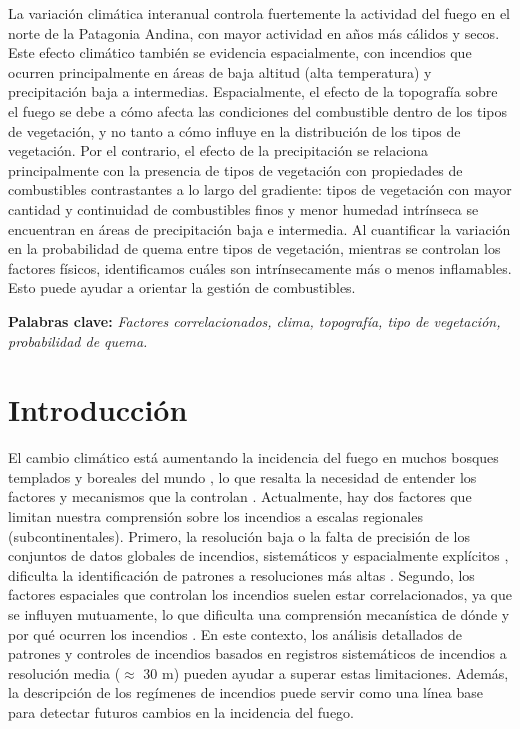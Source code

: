 La variación climática interanual controla fuertemente la actividad del fuego en el norte de la Patagonia Andina, con mayor actividad en años más cálidos y secos. Este efecto climático también se evidencia espacialmente, con incendios que ocurren principalmente en áreas de baja altitud (alta temperatura) y precipitación baja a intermedias. Espacialmente, el efecto de la topografía sobre el fuego se debe a cómo afecta las condiciones del combustible dentro de los tipos de vegetación, y no tanto a cómo influye en la distribución de los tipos de vegetación. Por el contrario, el efecto de la precipitación se relaciona principalmente con la presencia de tipos de vegetación con propiedades de combustibles contrastantes a lo largo del gradiente: tipos de vegetación con mayor cantidad y continuidad de combustibles finos y menor humedad intrínseca se encuentran en áreas de precipitación baja e intermedia. Al cuantificar la variación en la probabilidad de quema entre tipos de vegetación, mientras se controlan los factores físicos, identificamos cuáles son intrínsecamente más o menos inflamables. Esto puede ayudar a orientar la gestión de combustibles.

\noindent \textbf{Palabras clave:} \textit{Factores correlacionados, clima, topografía, tipo de vegetación, probabilidad de quema.}

\section{Introducción}

El cambio climático está aumentando la incidencia del fuego en muchos bosques templados y boreales del mundo \citep{flannigan_implications_2009,jones_global_2022,yang2023characterization,Jones2024}, lo que resalta la necesidad de entender los factores y mecanismos que la controlan \citep{bowman_vegetation_2020, shuman_reimagine_2022}. Actualmente, hay dos factores que limitan nuestra comprensión sobre los incendios a escalas regionales (subcontinentales). Primero, la resolución baja o la falta de precisión de los conjuntos de datos globales de incendios, sistemáticos y espacialmente explícitos \citep{giglio_collection_2018, long2019, lizundia-loiola_spatio-temporal_2020}, dificulta la identificación de patrones a resoluciones más altas \citep{chuvieco_satellite_2020}. Segundo, los factores espaciales que controlan los incendios suelen estar correlacionados, ya que se influyen mutuamente, lo que dificulta una comprensión mecanística de dónde y por qué ocurren los incendios \citep{wood_firescape_2011}. En este contexto, los análisis detallados de patrones y controles de incendios basados en registros sistemáticos de incendios a resolución media ($\approx$ 30 m) pueden ayudar a superar estas limitaciones. Además, la descripción de los regímenes de incendios puede servir como una línea base para detectar futuros cambios en la incidencia del fuego.

